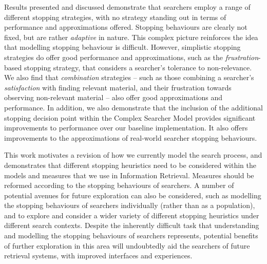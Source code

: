 \begin{preamble}
Results presented and discussed demonstrate that searchers employ a range of different stopping strategies, with no strategy standing out in terms of performance and approximations offered. Stopping behaviours are clearly not fixed, but are rather \emph{adaptive} in nature. This complex picture reinforces the idea that modelling stopping behaviour is difficult. However, simplistic stopping strategies do offer good performance and approximations, such as the \emph{frustration}-based stopping strategy, that considers a searcher's tolerance to non-relevance. We also find that \emph{combination} strategies -- such as those combining a searcher's \emph{satisfaction} with finding relevant material, and their frustration towards observing non-relevant material -- also offer good approximations and performance. In addition, we also demonstrate that the inclusion of the additional stopping decision point within the Complex Searcher Model provides significant improvements to performance over our baseline implementation. It also offers improvements to the approximations of real-world searcher stopping behaviours.

This work motivates a revision of how we currently model the search process, and demonstrates that different stopping heuristics need to be considered within the models and measures that we use in Information Retrieval. Measures should be reformed according to the stopping behaviours of searchers. A number of potential avenues for future exploration can also be considered, such as modelling the stopping behaviours of searchers individually (rather than as a population), and to explore and consider a wider variety of different stopping heuristics under different search contexts. Despite the inherently difficult task that understanding and modelling the stopping behaviours of searchers represents, potential benefits of further exploration in this area will undoubtedly aid the searchers of future retrieval systems, with improved interfaces and experiences.

\end{preamble}